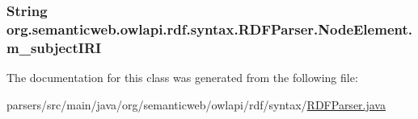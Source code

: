 \hypertarget{classorg_1_1semanticweb_1_1owlapi_1_1rdf_1_1syntax_1_1_r_d_f_parser_1_1_node_element_a89ba49419b7d16f00594dfd813eb995d}{
\subsubsection[{m\-\_\-subject\-I\-R\-I}]{\setlength{\rightskip}{0pt plus 5cm}String org.\-semanticweb.\-owlapi.\-rdf.\-syntax.\-R\-D\-F\-Parser.\-Node\-Element.\-m\-\_\-subject\-I\-R\-I\hspace{0.3cm}{\ttfamily [protected]}}}\label{classorg_1_1semanticweb_1_1owlapi_1_1rdf_1_1syntax_1_1_r_d_f_parser_1_1_node_element_a89ba49419b7d16f00594dfd813eb995d}


The documentation for this class was generated from the following file\-:\begin{DoxyCompactItemize}
\item 
parsers/src/main/java/org/semanticweb/owlapi/rdf/syntax/\hyperlink{_r_d_f_parser_8java}{R\-D\-F\-Parser.\-java}\end{DoxyCompactItemize}
